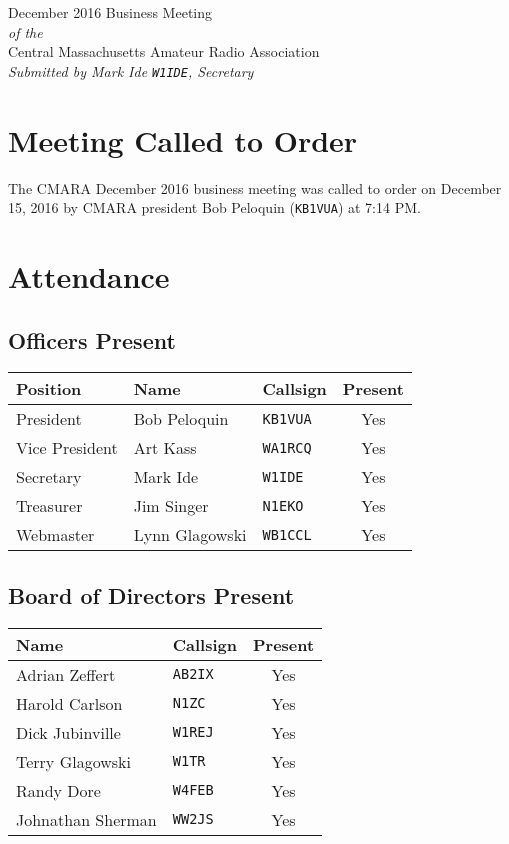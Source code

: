 \documentclass[10pt,letterpaper]{article}
\begin{document}
\begin{center}
{\huge December 2016 Business Meeting}\\
\emph{of the}\\
{\Large Central Massachusetts Amateur Radio Association}\\
\emph{Submitted by Mark Ide \texttt{W1IDE}, Secretary}
\end{center}

\section{Meeting Called to Order}
The CMARA December 2016 business meeting was called to order on December 15, 2016 by CMARA president Bob Peloquin (\texttt{KB1VUA}) at 7:14 PM.

\section{Attendance}

\subsection{Officers Present}
\begin{tabular}{|l|l|l|c|}
  \hline
  \textbf{Position} & \textbf{Name}  & \textbf{Callsign} & \textbf{Present} \\ \hline
  President         & Bob Peloquin   & \texttt{KB1VUA}   & Yes \\
  Vice President    & Art Kass       & \texttt{WA1RCQ}   & Yes \\
  Secretary         & Mark Ide       & \texttt{W1IDE}    & Yes \\
  Treasurer         & Jim Singer     & \texttt{N1EKO}    & Yes \\
  Webmaster         & Lynn Glagowski & \texttt{WB1CCL}   & Yes \\
  \hline
\end{tabular}

\subsection{Board of Directors Present}
\begin{tabular}{|l|l|c|}
  \hline
  \textbf{Name}     & \textbf{Callsign} & \textbf{Present} \\ \hline
  Adrian Zeffert    & \texttt{AB2IX}    & Yes \\
  Harold Carlson    & \texttt{N1ZC}     & Yes \\
  Dick Jubinville   & \texttt{W1REJ}    & Yes \\
  Terry Glagowski   & \texttt{W1TR}     & Yes \\
  Randy Dore        & \texttt{W4FEB}    & Yes \\
  Johnathan Sherman & \texttt{WW2JS}    & Yes \\
  \hline
\end{tabular}
\end{document}
